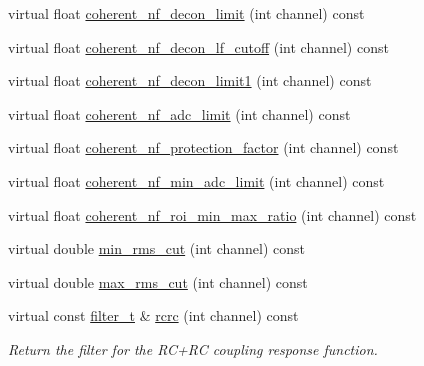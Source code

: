 \begin{DoxyCompactItemize}
\item 
virtual float \hyperlink{class_wire_cell_1_1_sig_proc_1_1_simple_channel_noise_d_b_a602938fd9dbdd7fe8093231a1d5c5d5a}{coherent\+\_\+nf\+\_\+decon\+\_\+limit} (int channel) const
\item 
virtual float \hyperlink{class_wire_cell_1_1_sig_proc_1_1_simple_channel_noise_d_b_a52def69ce297e7fc097b91a4472cbc25}{coherent\+\_\+nf\+\_\+decon\+\_\+lf\+\_\+cutoff} (int channel) const
\item 
virtual float \hyperlink{class_wire_cell_1_1_sig_proc_1_1_simple_channel_noise_d_b_a570a71f729172f7b19659f21d44b2e81}{coherent\+\_\+nf\+\_\+decon\+\_\+limit1} (int channel) const
\item 
virtual float \hyperlink{class_wire_cell_1_1_sig_proc_1_1_simple_channel_noise_d_b_a5c9dfedd62780fe11dafaa0739876803}{coherent\+\_\+nf\+\_\+adc\+\_\+limit} (int channel) const
\item 
virtual float \hyperlink{class_wire_cell_1_1_sig_proc_1_1_simple_channel_noise_d_b_aa17316b608537c3cf2c30ab600092bac}{coherent\+\_\+nf\+\_\+protection\+\_\+factor} (int channel) const
\item 
virtual float \hyperlink{class_wire_cell_1_1_sig_proc_1_1_simple_channel_noise_d_b_ab501b262245b5c052abd49fd0d67c803}{coherent\+\_\+nf\+\_\+min\+\_\+adc\+\_\+limit} (int channel) const
\item 
virtual float \hyperlink{class_wire_cell_1_1_sig_proc_1_1_simple_channel_noise_d_b_a31eba95e77c824eb351f3ed4e5e58eac}{coherent\+\_\+nf\+\_\+roi\+\_\+min\+\_\+max\+\_\+ratio} (int channel) const
\item 
virtual double \hyperlink{class_wire_cell_1_1_sig_proc_1_1_simple_channel_noise_d_b_a8e8aa023834a47f96b0bdb69bc76e7a8}{min\+\_\+rms\+\_\+cut} (int channel) const
\item 
virtual double \hyperlink{class_wire_cell_1_1_sig_proc_1_1_simple_channel_noise_d_b_a22eaf2783321cb45cd904f97de2ba7d3}{max\+\_\+rms\+\_\+cut} (int channel) const
\item 
virtual const \hyperlink{class_wire_cell_1_1_i_channel_noise_database_a0acbae29743542eb1c652f7a56e692f5}{filter\+\_\+t} \& \hyperlink{class_wire_cell_1_1_sig_proc_1_1_simple_channel_noise_d_b_a9a4481bf485a0aaa4903094463f4e2b3}{rcrc} (int channel) const
\begin{DoxyCompactList}\small\item\em Return the filter for the R\+C+\+RC coupling response function. \end{DoxyCompactList}\item 

\end{DoxyCompactItemize}
